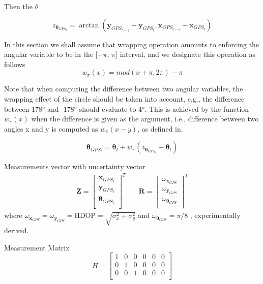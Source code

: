 Then the $\theta$


\begin{equation}
z_{\boldsymbol \theta_{GPS_t}} = \arctan(\mathbf{y}_{GPS_{t-1}} - \mathbf{y}_{GPS_t}, \mathbf{x}_{GPS_{t-1}} - \mathbf{x}_{GPS_t} )
\end{equation}

In this section we shall assume that wrapping operation
amounts to enforcing the angular variable to be in the [$-\pi$, $\pi$]
interval, and we designate this operation as follows
\begin{equation}
w_{\pi}(x) = mod(x + \pi, 2\pi) - \pi
\end{equation}

Note that when computing the difference between two angular
variables, the wrapping effect of the circle should be taken into
account, e.g., the difference between 178° and -178° should
evaluate to 4°. This is achieved by the function $w_{\pi}(x)$ when the difference
is given as the argument, i.e., difference between two angles
x and y is computed as $w_{\pi}(x-y)$, as defined in\cite{markovic_wrapping_2017}.

$$
\boldsymbol \theta_{GPS_t} = \boldsymbol \theta_{t} + w_{\pi}(z_{\boldsymbol \theta_{GPS_t}} - \boldsymbol \theta_{t})
$$

Measurements vector with uncertainty vector
\begin{align}
\mathbf{Z}
=
\begin{bmatrix}
\mathbf{x}_{GPS_t} \\
\mathbf{y}_{GPS_t} \\
\boldsymbol \theta_{GPS_t} \\
\end{bmatrix}^T
& \quad
\mathbf{R}
=
\begin{bmatrix}
\omega_{\mathbf{x}_{GPS}} \\
\omega_{\mathbf{y}_{GPS}} \\
\omega_{\boldsymbol \theta_{GPS}} \\
\end{bmatrix}^T
\end{align}
where $ \omega_{\mathbf{x}_{GPS}} = \omega_{\mathbf{y}_{GPS}} = \text{HDOP} = \sqrt{\sigma_x^2 + \sigma_y^2}$ and
$ \omega_{\boldsymbol \theta_{GPS}} = \pi/8 $ , experimentally derived.

Measurement Matrix
\begin{equation}
H
=
\begin{bmatrix}
1 & 0 & 0 & 0 & 0 & 0 \\
0 & 1 & 0 & 0 & 0 & 0 \\
0 & 0 & 1 & 0 & 0 & 0 \\
\end{bmatrix}
\end{equation}

